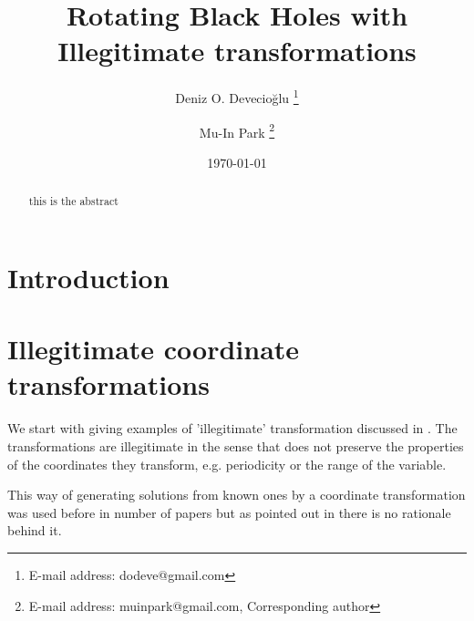 \documentclass[preprint,aps,tightenlines,showkeys,nofootinbib,superscriptaddress,amsmath]{revtex4}
\begin{document}

\title{Rotating Black Holes with Illegitimate transformations}

\author{Deniz O. Devecio\u{g}lu \footnote{E-mail address: dodeve@gmail.com}}

\author{Mu-In Park \footnote{E-mail address: muinpark@gmail.com,
Corresponding author}}
\date{\today}

\begin{abstract}
  this is the abstract

\end{abstract}


\maketitle

\newpage

\section{Introduction}

\section{Illegitimate coordinate transformations}
We start with giving examples of 'illegitimate' transformation discussed in
\cite{Martinez:1999qi}. The transformations are illegitimate in the
sense that does not preserve the properties of the coordinates they
transform, e.g. periodicity or the range of the variable.

This way of generating solutions from known ones by a coordinate
transformation was used before in number of papers
\cite{Deser:1985pk,Deser:1983tn} but as pointed out in
\cite{Martinez:1999qi} there is no rationale behind it.
\end{document}
